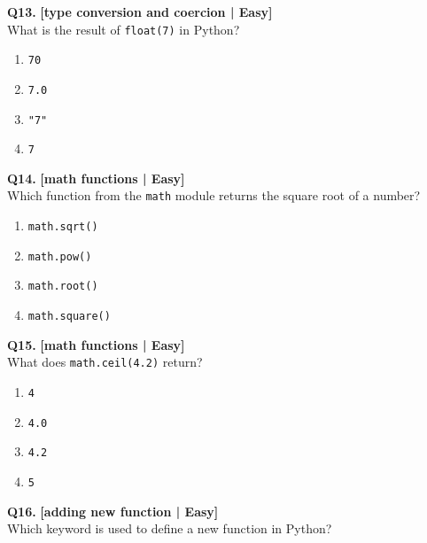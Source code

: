 \noindent\textbf{Q13.} \hfill {\small\color{LPUOrange}\textbf{[type conversion and coercion | Easy]}}\\[2pt]
What is the result of \texttt{float(7)} in Python?

\begin{enumerate}[label=(\alph*),topsep=2pt,itemsep=1pt,partopsep=0pt,parsep=0pt]
    \item \relax \texttt{70}
    \item \relax \texttt{7.0}
    \item \relax \texttt{"7"}
    \item \relax \texttt{7}
\end{enumerate}
\vspace{2mm}

\noindent\textbf{Q14.} \hfill {\small\color{LPUOrange}\textbf{[math functions | Easy]}}\\[2pt]
Which function from the \texttt{math} module returns the square root of a number?

\begin{enumerate}[label=(\alph*),topsep=2pt,itemsep=1pt,partopsep=0pt,parsep=0pt]
    \item \relax \texttt{math.sqrt()}
    \item \relax \texttt{math.pow()}
    \item \relax \texttt{math.root()}
    \item \relax \texttt{math.square()}
\end{enumerate}
\vspace{2mm}

\noindent\textbf{Q15.} \hfill {\small\color{LPUOrange}\textbf{[math functions | Easy]}}\\[2pt]
What does \texttt{math.ceil(4.2)} return?

\begin{enumerate}[label=(\alph*),topsep=2pt,itemsep=1pt,partopsep=0pt,parsep=0pt]
    \item \relax \texttt{4}
    \item \relax \texttt{4.0}
    \item \relax \texttt{4.2}
    \item \relax \texttt{5}
\end{enumerate}
\vspace{2mm}

\noindent\textbf{Q16.} \hfill {\small\color{LPUOrange}\textbf{[adding new function | Easy]}}\\[2pt]
Which keyword is used to define a new function in Python?

